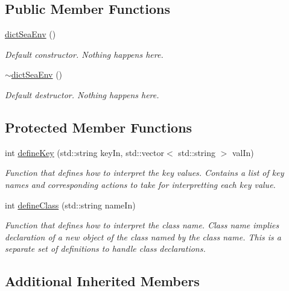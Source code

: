 \subsection*{Public Member Functions}
\begin{DoxyCompactItemize}
\item 
\hyperlink{classosea_1_1ofreq_1_1dict_sea_env_aa5e273c720bff861acf9dece4376b801}{dict\-Sea\-Env} ()
\begin{DoxyCompactList}\small\item\em Default constructor. Nothing happens here. \end{DoxyCompactList}\item 
\hyperlink{classosea_1_1ofreq_1_1dict_sea_env_ad2a5dec9edc67afbb52dba2e257c06e9}{$\sim$dict\-Sea\-Env} ()
\begin{DoxyCompactList}\small\item\em Default destructor. Nothing happens here. \end{DoxyCompactList}\end{DoxyCompactItemize}
\subsection*{Protected Member Functions}
\begin{DoxyCompactItemize}
\item 
int \hyperlink{classosea_1_1ofreq_1_1dict_sea_env_a40ff29cc136e2920e6af22e0f49e6147}{define\-Key} (std\-::string key\-In, std\-::vector$<$ std\-::string $>$ val\-In)
\begin{DoxyCompactList}\small\item\em Function that defines how to interpret the key values. Contains a list of key names and corresponding actions to take for interpretting each key value. \end{DoxyCompactList}\item 
int \hyperlink{classosea_1_1ofreq_1_1dict_sea_env_af2a7f74d940c39e3b60bca8748198dfb}{define\-Class} (std\-::string name\-In)
\begin{DoxyCompactList}\small\item\em Function that defines how to interpret the class name. Class name implies declaration of a new object of the class named by the class name. This is a separate set of definitions to handle class declarations. \end{DoxyCompactList}\end{DoxyCompactItemize}
\subsection*{Additional Inherited Members}



